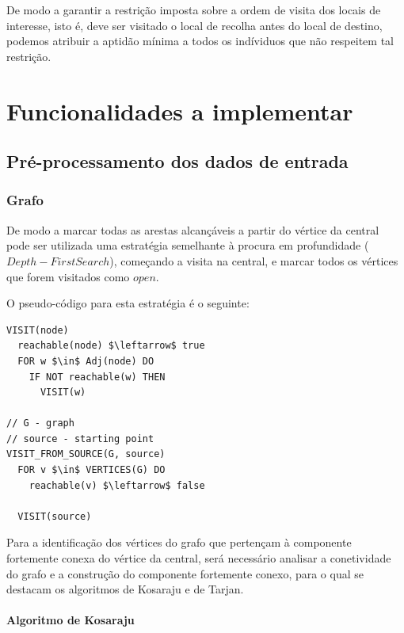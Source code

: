 \documentclass[article, a4paper, 12pt, oneside]{memoir}
\begin{document}
De modo a garantir a restrição imposta sobre a ordem de visita dos locais de interesse, isto é, deve ser visitado o local de recolha antes do local de destino, podemos atribuir a aptidão mínima a todos os indíviduos que não respeitem tal restrição.

\newpage
\chapter[Funcionalidades a implementar][Funcionalidades a implementar]{Funcionalidades a implementar} \label{\thechapter}

\section{Pré-processamento dos dados de entrada}

\subsection{Grafo}
De modo a marcar todas as arestas alcançáveis a partir do vértice da central pode ser utilizada uma estratégia semelhante à procura em profundidade ($Depth-First Search$), começando a visita na central, e marcar todos os vértices que forem visitados como $open$.

O pseudo-código para esta estratégia é o seguinte:

\begin{lstlisting}[frame=single, mathescape=true]
VISIT(node)
  reachable(node) $\leftarrow$ true
  FOR w $\in$ Adj(node) DO
    IF NOT reachable(w) THEN
      VISIT(w)

// G - graph
// source - starting point
VISIT_FROM_SOURCE(G, source)
  FOR v $\in$ VERTICES(G) DO
    reachable(v) $\leftarrow$ false

  VISIT(source)
\end{lstlisting}

Para a identificação dos vértices do grafo que pertençam à componente fortemente conexa do vértice da central, será necessário analisar a conetividade do grafo e a construção do componente fortemente conexo, para o qual se destacam os algoritmos de Kosaraju e de Tarjan.

\subsubsection{Algoritmo de Kosaraju}
\end{document}
